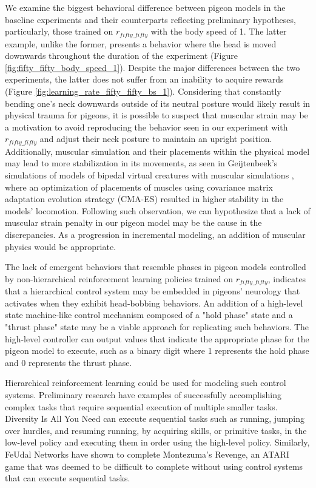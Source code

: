   We examine the biggest behavioral difference between pigeon models in the baseline experiments and their counterparts reflecting preliminary hypotheses, particularly, those trained on $r_{fifty\_fifty}$ with the body speed of 1.
  The latter example, unlike the former, presents a behavior where the head is moved downwards throughout the duration of the experiment (Figure \ref{fig:fifty_fifty_body_speed_1}).
  Despite the major differences between the two experiments, the latter does not suffer from an inability to acquire rewards (Figure \ref{fig:learning_rate_fifty_fifty_bs_1}).
  Considering that constantly bending one's neck downwards outside of its neutral posture would likely result in physical trauma for pigeons, it is possible to suspect that muscular strain may be a motivation to avoid reproducing the behavior seen in our experiment with $r_{fifty\_fifty}$ and adjust their neck posture to maintain an upright position.
  Additionally, muscular simulation and their placements within the physical model may lead to more stabilization in its movements, as seen in Geijtenbeek's simulations of models of bipedal virtual creatures with muscular simulations \cite{geijtenbeek2013flexible}, where an optimization of placements of muscles using covariance matrix adaptation evolution strategy (CMA-ES) resulted in higher stability in the models' locomotion.
  Following such observation, we can hypothesize that a lack of muscular strain penalty in our pigeon model may be the cause in the discrepancies. As a progression in incremental modeling, an addition of muscular physics would be appropriate.


  The lack of emergent behaviors that resemble phases in pigeon models controlled by non-hierarchical reinforcement learning policies trained on $r_{fifty\_fifty}$, indicates that a hierarchical control system may be embedded in pigeons' neurology that activates when they exhibit head-bobbing behaviors.
  An addition of a high-level state machine-like control mechanism composed of a "hold phase" state and a "thrust phase" state may be a viable approach for replicating such behaviors.
  The high-level controller can output values that indicate the appropriate phase for the pigeon model to execute, such as a binary digit where 1 represents the hold phase and 0 represents the thrust phase.

  Hierarchical reinforcement learning could be used for modeling such control systems.
  Preliminary research have examples of successfully accomplishing complex tasks that require sequential execution of multiple smaller tasks.
  Diversity Is All You Need \cite{eysenbach2018diversity} can execute sequential tasks such as running, jumping over hurdles, and resuming running, by acquiring skills, or primitive tasks, in the low-level policy and executing them in order using the high-level policy.
  Similarly, FeUdal Networks \cite{vezhnevets2017feudal} have shown to complete Montezuma's Revenge, an ATARI game that was deemed to be difficult to complete without using control systems that can execute sequential tasks.

